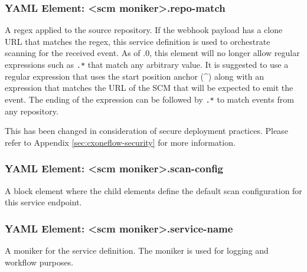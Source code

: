 \subsubsection{YAML Element: <scm moniker>.repo-match}\label{sec:yaml-moniker-repo-match}
A regex applied to the source repository.  If the webhook payload has
a clone URL that matches the regex, this service definition is used to orchestrate scanning
for the received event.  As of .0, this element will no longer allow regular
expressions such as \texttt{.*} that match any arbitrary value.  It is suggested to use
a regular expression that uses the start position anchor (\^{}) along with an expression
that matches the URL of the SCM that will be expected to emit the event.  The ending of
the expression can be followed by \texttt{.*} to match events from any repository.

This has been changed in consideration of secure deployment practices.  Please refer to
Appendix \ref{sec:cxoneflow-security} for more information.

\subsubsection{YAML Element: <scm moniker>.scan-config}\label{sec:yaml-moniker-scan-config}
A block element where the child elements define the default scan configuration for this service endpoint.

\subsubsection{YAML Element: <scm moniker>.service-name}\label{sec:yaml-moniker-service-name}
A moniker for the service definition. The moniker is used for logging and workflow purposes.







